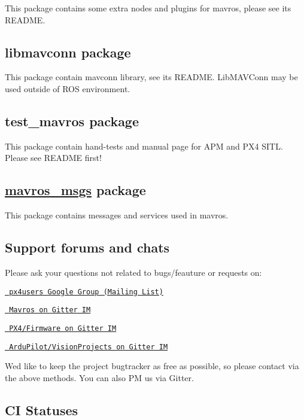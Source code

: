 This package contains some extra nodes and plugins for mavros, please see its R\+E\+A\+D\+ME.

\subsection*{libmavconn package }

This package contain mavconn library, see its R\+E\+A\+D\+ME. Lib\+M\+A\+V\+Conn may be used outside of R\+OS environment.

\subsection*{test\+\_\+mavros package }

This package contain hand-\/tests and manual page for A\+PM and P\+X4 S\+I\+TL. Please see R\+E\+A\+D\+ME first!

\subsection*{\mbox{\hyperlink{namespacemavros__msgs}{mavros\+\_\+msgs}} package }

This package contains messages and services used in mavros.

\subsection*{Support forums and chats }

Please ask your questions not related to bugs/feauture or requests on\+:


\begin{DoxyItemize}
\item \href{https://groups.google.com/forum/\#!forum/px4users}{\texttt{ px4users Google Group (Mailing List)}}
\item \href{https://gitter.im/mavlink/mavros}{\texttt{ Mavros on Gitter IM}}
\item \href{https://gitter.im/PX4/Firmware}{\texttt{ P\+X4/\+Firmware on Gitter IM}}
\item \href{https://gitter.im/ArduPilot/ardupilot/VisionProjects}{\texttt{ Ardu\+Pilot/\+Vision\+Projects on Gitter IM}}
\end{DoxyItemize}

We\textquotesingle{}d like to keep the project bugtracker as free as possible, so please contact via the above methods. You can also PM us via Gitter.

\subsection*{CI Statuses }


